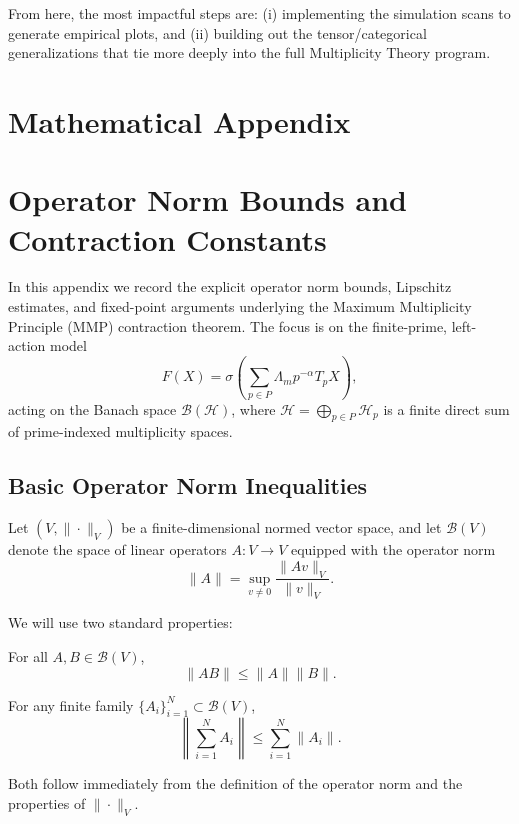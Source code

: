 \documentclass[12pt]{article}
\begin{document}
From here, the most impactful steps are: (i) implementing the simulation scans to generate empirical plots, and (ii) building out the tensor/categorical generalizations that tie more deeply into the full Multiplicity Theory program.

\appendix
\section*{Mathematical Appendix}

\section{Operator Norm Bounds and Contraction Constants}
\label{sec:appendix-norms}

In this appendix we record the explicit operator norm bounds, Lipschitz estimates, and fixed-point arguments underlying the Maximum Multiplicity Principle (MMP) contraction theorem. The focus is on the finite-prime, left-action model
\[
  F(X) = \sigma\!\left(\sum_{p\in P} \Lambda_m p^{-\alpha} T_p X\right),
\]
acting on the Banach space \(\mathcal{B}(\mathcal{H})\), where \(\mathcal{H} = \bigoplus_{p\in P} \mathcal{H}_p\) is a finite direct sum of prime-indexed multiplicity spaces.

\subsection{Basic Operator Norm Inequalities}

Let \((V,\|\cdot\|_V)\) be a finite-dimensional normed vector space, and let \(\mathcal{B}(V)\) denote the space of linear operators \(A:V\to V\) equipped with the operator norm
\[
  \|A\| = \sup_{v\neq 0} \frac{\|Av\|_V}{\|v\|_V}.
\]

We will use two standard properties:

\begin{lemma}[Submultiplicativity]
For all \(A,B\in\mathcal{B}(V)\),
\[
  \|AB\| \le \|A\|\|B\|.
\]
\end{lemma}

\begin{lemma}
For any finite family \(\{A_i\}_{i=1}^N \subset \mathcal{B}(V)\),
\[
  \left\|\sum_{i=1}^N A_i\right\| \le \sum_{i=1}^N \|A_i\|.
\]
\end{lemma}

Both follow immediately from the definition of the operator norm and the properties of \(\|\cdot\|_V\).
\end{document}
